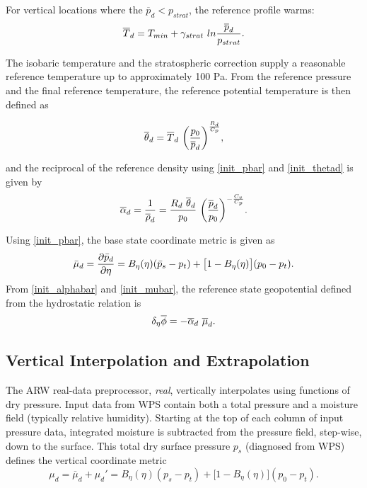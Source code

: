 \noindent For vertical locations where the $\overline{p}_d < p_{strat}$, the reference profile warms:
\begin{equation}
\overline{T}_d = T_{min} + \gamma_{strat}~ln {\overline{p}_d \over p_{strat}}.
\notag
\end{equation}

\noindent The isobaric temperature and the stratospheric correction supply a 
reasonable reference temperature up to approximately 100 Pa. 
From the reference pressure and the final reference temperature, 
the reference potential temperature is then defined as

\noindent
\begin{equation}
\overline{\theta}_d = \overline{T}_d~{\bigg( {p_0 \over \overline{p}_d } \bigg) }
^{R_d \over C_p},
\label{init_thetad}
\end{equation}

\noindent and the reciprocal of the reference density using 
\eqref{init_pbar} and \eqref{init_thetad} is given by
\begin{equation}
\overline{\alpha}_d = {1 \over \overline{\rho}_d} = {{R_d ~\overline{\theta}_d}\over p_{0} }~\bigg( 
{\overline{p}_d \over p_{0} } \bigg)^{-{C_v \over C_p}}.
\label{init_alphabar}
\end{equation}

\noindent Using \eqref{init_pbar}, the base state coordinate metric is given as
%
\begin{equation}
\bar\mu_d= {\partial \bar p_d\over\partial\eta} = B_\eta(\eta)(\bar p_s-p_t)+\bigl[1-B_\eta(\eta)\bigr](p_0-p_t).
\label{init_mubar}
\end{equation}
%
\noindent 
From \eqref{init_alphabar} and \eqref{init_mubar}, 
the reference state geopotential defined from the hydrostatic relation is
\begin{equation}
\delta_{\eta} \overline{\phi}  = -\overline{\alpha}_d~\overline{\mu}_d.
\notag
\end{equation}


\subsection{Vertical Interpolation and Extrapolation}

The ARW real-data preprocessor, {\it real}, vertically interpolates using functions of dry pressure.
Input data from WPS contain both a total pressure and a moisture field (typically
relative humidity).  Starting at the top of each column of input pressure data, integrated moisture
is subtracted from the pressure field, step-wise, down to the surface.  
This total dry surface pressure $p_{s}$ (diagnosed from WPS) defines the vertical coordinate metric
\begin{equation}
\mu_d = \overline{\mu}_d + \mu_d' = B_\eta(\eta)(p_s-p_t)+\bigl[1-B_\eta(\eta)\bigr](p_0-p_t).
\label{init_mutotal}
\end{equation}

